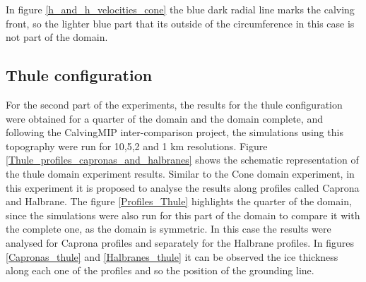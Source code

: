 \documentclass{article}
\begin{document}
In figure \ref{h_and_h_velocities_cone} the blue dark radial line marks the calving front, so the lighter blue part that its outside of the circumference in this case is not part of the domain.

\subsection{Thule configuration}
For the second part of the experiments, the results for the thule configuration were obtained for a quarter of the domain and the domain complete, and following the CalvingMIP inter-comparison project, the simulations using this topography were run for 10,5,2 and 1 km resolutions. Figure \ref{Thule_profiles_capronas_and_halbranes} shows the schematic representation of the thule domain experiment results. Similar to the Cone domain experiment, in this experiment it is proposed to analyse the results along profiles called Caprona and Halbrane. The figure \ref{Profiles_Thule} highlights the quarter of the domain, since the simulations were also run for this part of the domain to compare it with the complete one, as the domain is symmetric. In this case the results were analysed for Caprona profiles and separately for the Halbrane profiles. In figures \ref{Capronas_thule} and \ref{Halbranes_thule} it can be observed the ice thickness along each one of the profiles and so the position of the grounding line.
\end{document}
